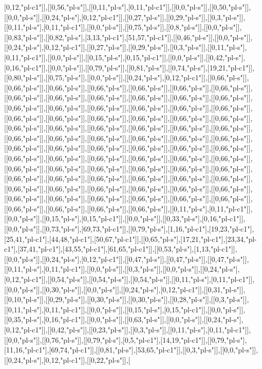 [0,12,"pl-c1"]],[[0,56,"pl-s"]],[[0,11,"pl-s"],[0,11,"pl-c1"]],[[0,0,"pl-s"]],[[0,50,"pl-s"]],[[0,0,"pl-s"]],[[0,24,"pl-s"],[0,12,"pl-c1"]],[[0,27,"pl-s"]],[[0,29,"pl-s"]],[[0,3,"pl-s"]],[[0,11,"pl-s"],[0,11,"pl-c1"]],[[0,0,"pl-s"]],[[0,75,"pl-s"]],[[0,8,"pl-s"]],[[0,0,"pl-s"]],[[0,83,"pl-s"]],[[0,82,"pl-s"],[3,13,"pl-c1"],[51,57,"pl-c1"]],[[0,46,"pl-s"]],[[0,0,"pl-s"]],[[0,24,"pl-s"],[0,12,"pl-c1"]],[[0,27,"pl-s"]],[[0,29,"pl-s"]],[[0,3,"pl-s"]],[[0,11,"pl-s"],[0,11,"pl-c1"]],[[0,0,"pl-s"]],[[0,15,"pl-s"],[0,15,"pl-c1"]],[[0,0,"pl-s"]],[[0,42,"pl-s"],[0,16,"pl-c1"]],[[0,0,"pl-s"]],[[0,79,"pl-s"]],[[0,81,"pl-s"]],[[0,74,"pl-s"],[19,21,"pl-c1"]],[[0,80,"pl-s"]],[[0,75,"pl-s"]],[[0,0,"pl-s"]],[[0,24,"pl-s"],[0,12,"pl-c1"]],[[0,66,"pl-s"]],[[0,66,"pl-s"]],[[0,66,"pl-s"]],[[0,66,"pl-s"]],[[0,66,"pl-s"]],[[0,66,"pl-s"]],[[0,66,"pl-s"]],[[0,66,"pl-s"]],[[0,66,"pl-s"]],[[0,66,"pl-s"]],[[0,66,"pl-s"]],[[0,66,"pl-s"]],[[0,66,"pl-s"]],[[0,66,"pl-s"]],[[0,66,"pl-s"]],[[0,66,"pl-s"]],[[0,66,"pl-s"]],[[0,66,"pl-s"]],[[0,66,"pl-s"]],[[0,66,"pl-s"]],[[0,66,"pl-s"]],[[0,66,"pl-s"]],[[0,66,"pl-s"]],[[0,66,"pl-s"]],[[0,66,"pl-s"]],[[0,66,"pl-s"]],[[0,66,"pl-s"]],[[0,66,"pl-s"]],[[0,66,"pl-s"]],[[0,66,"pl-s"]],[[0,66,"pl-s"]],[[0,66,"pl-s"]],[[0,66,"pl-s"]],[[0,66,"pl-s"]],[[0,66,"pl-s"]],[[0,66,"pl-s"]],[[0,66,"pl-s"]],[[0,66,"pl-s"]],[[0,66,"pl-s"]],[[0,66,"pl-s"]],[[0,66,"pl-s"]],[[0,66,"pl-s"]],[[0,66,"pl-s"]],[[0,66,"pl-s"]],[[0,66,"pl-s"]],[[0,66,"pl-s"]],[[0,66,"pl-s"]],[[0,66,"pl-s"]],[[0,66,"pl-s"]],[[0,66,"pl-s"]],[[0,66,"pl-s"]],[[0,66,"pl-s"]],[[0,66,"pl-s"]],[[0,66,"pl-s"]],[[0,66,"pl-s"]],[[0,66,"pl-s"]],[[0,66,"pl-s"]],[[0,66,"pl-s"]],[[0,66,"pl-s"]],[[0,66,"pl-s"]],[[0,66,"pl-s"]],[[0,66,"pl-s"]],[[0,66,"pl-s"]],[[0,66,"pl-s"]],[[0,66,"pl-s"]],[[0,66,"pl-s"]],[[0,66,"pl-s"]],[[0,66,"pl-s"]],[[0,66,"pl-s"]],[[0,66,"pl-s"]],[[0,66,"pl-s"]],[[0,66,"pl-s"]],[[0,66,"pl-s"]],[[0,66,"pl-s"]],[[0,66,"pl-s"]],[[0,66,"pl-s"]],[[0,66,"pl-s"]],[[0,11,"pl-s"],[0,11,"pl-c1"]],[[0,0,"pl-s"]],[[0,15,"pl-s"],[0,15,"pl-c1"]],[[0,0,"pl-s"]],[[0,33,"pl-s"],[0,16,"pl-c1"]],[[0,0,"pl-s"]],[[0,73,"pl-s"],[69,73,"pl-c1"]],[[0,79,"pl-s"],[1,16,"pl-c1"],[19,23,"pl-c1"],[25,41,"pl-c1"],[44,48,"pl-c1"],[50,67,"pl-c1"]],[[0,65,"pl-s"],[17,21,"pl-c1"],[23,34,"pl-c1"],[37,41,"pl-c1"],[43,55,"pl-c1"],[61,65,"pl-c1"]],[[0,53,"pl-s"],[1,13,"pl-c1"]],[[0,0,"pl-s"]],[[0,24,"pl-s"],[0,12,"pl-c1"]],[[0,47,"pl-s"]],[[0,47,"pl-s"]],[[0,47,"pl-s"]],[[0,11,"pl-s"],[0,11,"pl-c1"]],[[0,0,"pl-s"]],[[0,3,"pl-s"]],[[0,0,"pl-s"]],[[0,24,"pl-s"],[0,12,"pl-c1"]],[[0,54,"pl-s"]],[[0,54,"pl-s"]],[[0,54,"pl-s"]],[[0,11,"pl-s"],[0,11,"pl-c1"]],[[0,0,"pl-s"]],[[0,30,"pl-s"]],[[0,0,"pl-s"]],[[0,24,"pl-s"],[0,12,"pl-c1"]],[[0,31,"pl-s"]],[[0,10,"pl-s"]],[[0,29,"pl-s"]],[[0,30,"pl-s"]],[[0,30,"pl-s"]],[[0,28,"pl-s"]],[[0,3,"pl-s"]],[[0,11,"pl-s"],[0,11,"pl-c1"]],[[0,0,"pl-s"]],[[0,15,"pl-s"],[0,15,"pl-c1"]],[[0,0,"pl-s"]],[[0,35,"pl-s"],[0,16,"pl-c1"]],[[0,0,"pl-s"]],[[0,63,"pl-s"]],[[0,0,"pl-s"]],[[0,24,"pl-s"],[0,12,"pl-c1"]],[[0,42,"pl-s"]],[[0,23,"pl-s"]],[[0,3,"pl-s"]],[[0,11,"pl-s"],[0,11,"pl-c1"]],[[0,0,"pl-s"]],[[0,76,"pl-s"]],[[0,79,"pl-s"],[0,5,"pl-c1"],[14,19,"pl-c1"]],[[0,79,"pl-s"],[11,16,"pl-c1"],[69,74,"pl-c1"]],[[0,81,"pl-s"],[53,65,"pl-c1"]],[[0,3,"pl-s"]],[[0,0,"pl-s"]],[[0,24,"pl-s"],[0,12,"pl-c1"]],[[0,22,"pl-s"]],[